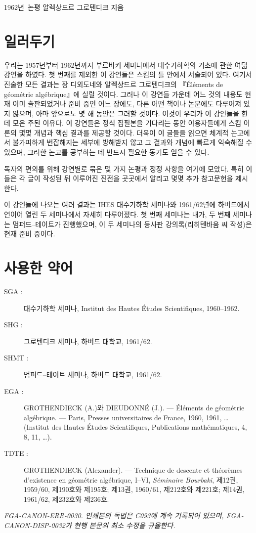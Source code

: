 \unit{1962년 논평}
%
  {알렉상드르 그로텐디크 지음}

\section*{일러두기}

우리는 1957년부터 1962년까지 부르바키 세미나에서 대수기하학의 기초에
관한 여덟 강연을 하였다. 첫 번째를 제외한 이 강연들은 스킴의 틀 안에서
서술되어 있다. 여기서 진술한 모든 결과는 장 디외도네와 알렉상드르
그로텐디크의 『Éléments de géométrie algébrique』에 실릴 것이다. 그러나
이 강연들 가운데 어느 것의 내용도 현재 이미 출판되었거나 준비 중인 어느
장에도, 다른 어떤 책이나 논문에도 다루어져 있지 않으며, 아마 앞으로도
몇 해 동안은 그러할 것이다. 이것이 우리가 이 강연들을 한데 모은 주된
이유다. 이 강연들은 정식 집필본을 기다리는 동안 이용자들에게 스킴 이론의
몇몇 개념과 핵심 결과를 제공할 것이다. 더욱이 이 글들을 읽으면 체계적
논고에서 불가피하게 번잡해지는 세부에 방해받지 않고 그 결과와 개념에
빠르게 익숙해질 수 있으며, 그러한 논고를 공부하는 데 반드시 필요한
동기도 얻을 수 있다.

독자의 편의를 위해 강연별로 묶은 몇 가지 논평과 정정 사항을 여기에
모았다. 특히 이들은 각 글이 작성된 뒤 이루어진 진전을 곳곳에서 알리고
몇몇 추가 참고문헌을 제시한다.

이 강연들에 나오는 여러 결과는 IHES 대수기하학 세미나와 1961/62년에
하버드에서 연이어 열린 두 세미나에서 자세히 다루어졌다. 첫 번째 세미나는
내가, 두 번째 세미나는 멈퍼드--테이트가 진행했으며, 이 두 세미나의 등사판
강의록(리히텐바움 씨 작성)은 현재 준비 중이다.

\section*{사용한 약어}

\begin{description}
\item[SGA :] 대수기하학 세미나, Institut des Hautes Études Scientifiques,
1960--1962.

\item[SHG :] 그로텐디크 세미나, 하버드 대학교, 1961/62.

\item[SHMT :] 멈퍼드--테이트 세미나, 하버드 대학교, 1961/62.

\item[EGA :] GROTHENDIECK (A.)와 DIEUDONNÉ (J.). --- Éléments de géométrie
algébrique. --- Paris, Presses universitaires de France, 1960, 1961, …
(Institut des Hautes Études Scientifiques, Publications mathématiques, 4, 8,
11, …).

\item[TDTE :] GROTHENDIECK (Alexander). --- Technique de descente et théorèmes
d'existence en géométrie algébrique, I--VI, \emph{Séminaire Bourbaki}, 제12권,
1959/60, 제190호와 제195호; 제13권, 1960/61, 제212호와 제221호; 제14권,
1961/62, 제232호와 제236호.
\end{description}

\par\smallskip
\begingroup\footnotesize
\noindent\textit{FGA-CANON-ERR-0030. 인쇄본의 독법은 C093에 계속 기록되어 있으며, FGA-CANON-DISP-0032가 현행 본문의 최소 수정을 규율한다.}\par
\endgroup
